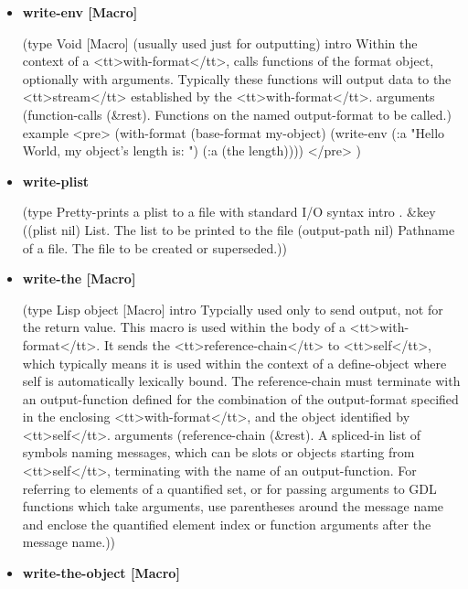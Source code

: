 \documentclass [11pt]{book}
\begin{document}
\begin{itemize}
\item {}
\label{prim:write-env}
\textbf{write-env [Macro]}

(type Void [Macro] (usually used just for outputting) intro
  Within the context of a <tt>with-format</tt>, calls functions of
the format object, optionally with arguments. Typically these functions will output data to the
<tt>stream</tt> established by the <tt>with-format</tt>.
 arguments
 (function-calls
  (\&rest). Functions on the named output-format to be called.)
 example 
<pre>
 (with-format (base-format my-object) (write-env (:a "Hello World, my object's length is: ")
                                                 (:a (the length))))
</pre>
)



\item {}
\label{prim:write-plist}
\textbf{write-plist}

(type Pretty-prints a plist to a file with standard I/O syntax intro .
 \&key
 ((plist nil) List. The list to be printed to the file
  (output-path nil)
  Pathname of a file. The file to be created or superseded.))



\item {}
\label{prim:write-the}
\textbf{write-the [Macro]}

(type Lisp object [Macro] intro
  Typcially used only to send output, not for the return value. This macro
is used within the body of a <tt>with-format</tt>. It sends the <tt>reference-chain</tt> to
<tt>self</tt>, which typically means it is used within the context of a define-object where
self is automatically lexically bound.
The reference-chain must terminate with an output-function defined for
the combination of the output-format specified in the enclosing
<tt>with-format</tt>, and the object identified by <tt>self</tt>.
 arguments
 (reference-chain
  (\&rest). A spliced-in list of symbols naming messages, which can 
be slots or objects starting from <tt>self</tt>, terminating with the name of an output-function.
For referring to elements of a quantified set, or for passing arguments to GDL functions which
take arguments, use parentheses around the message name and enclose the quantified element index
or function arguments after the message name.))



\item {}
\label{prim:write-the-object}
\textbf{write-the-object [Macro]}


\end{itemize}
\end{document}
